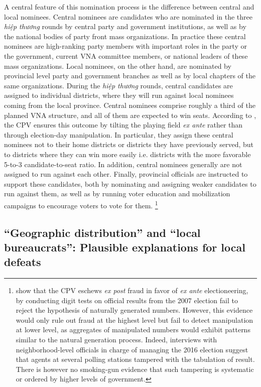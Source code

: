 \documentclass[12pt]{article}\usepackage[]{graphicx}\usepackage[]{color}
\newcommand{\1}{\mathbbm{1}}
\begin{document}
A central feature of this nomination process is the difference between central and local nominees. Central nominees are candidates who are nominated in the three \textit{hiệp thương} rounds by central party and government institutions, as well as by the national bodies of party front mass organizations. In practice these central nominees are high-ranking party members with important roles in the party or the government, current VNA committee members, or national leaders of these mass organizations. Local nominees, on the other hand, are nominated by provincial level party and government branches as well as by local chapters of the same organizations. During the \textit{hiệp thương} rounds, central candidates are assigned to individual districts, where they will run against local nominees coming from the local province. Central nominees comprise roughly a third of the planned VNA structure, and all of them are expected to win seats. According to \cite{MaleskySchuler2011}, the CPV ensures this outcome by tilting the playing field \textit{ex ante} rather than through election-day manipulation. In particular, they assign these central nominees not to their home districts or districts they have previously served, but to districts where they can win more easily i.e. districts with the more favorable 5-to-3 candidate-to-seat ratio. In addition,  central nominees generally are not assigned to run against each other. Finally, provincial officials are instructed to support these candidates, both by nominating and assigning  weaker candidates to run against them, as well as by running voter education and mobilization campaigns to encourage voters to vote for them. \footnote{\cite{MaleskySchuler2011} show that the CPV eschews \textit{ex post} fraud in favor of \textit{ex ante} electioneering, by conducting digit tests on official results from the 2007 election fail to reject the hypothesis of naturally generated numbers. However, this evidence would only rule out fraud at the highest level but fail to detect manipulation at lower level, as aggregates of manipulated numbers would exhibit patterns similar to the natural generation process. Indeed, interviews with neighborhood-level officials in charge of managing the 2016 election suggest that agents at several polling stations tampered with the tabulation of result. There is however no smoking-gun evidence that such tampering is systematic or ordered by higher levels of government.}

\subsection{``Geographic distribution'' and ``local bureaucrats'': Plausible explanations for local defeats}
\end{document}
